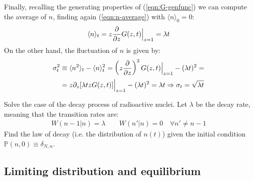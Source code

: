 \documentclass[../../main.tex]{subfiles}
\begin{document}
\begin{example}
    Finally, recalling the generating properties of (\ref{eqn:G-genfunc}) we can compute the average of $n$, finding again (\ref{eqn:n-average}) with $\langle n \rangle_0 = 0$:
    \begin{align*}
        \langle n \rangle_t = z \pdv{z} G(z,t) \Big|_{z=1} = \lambda t
    \end{align*}
    On the other hand, the fluctuation of $n$ is given by:
    \begin{align*}
        \sigma_t^2 &\equiv \langle n^2 \rangle_t - \langle n \rangle^2_t = \left(z \pdv{z}\right)^2 G(z,t)\Big|_{z=1} - (\lambda t)^2 = \\
        &= z \partial_z [\lambda t z G(z,t)]\Big|_{z=1} - (\lambda t)^2 = \lambda t \Rightarrow \sigma_t = \sqrt{\lambda t}
    \end{align*}
\end{example}

\begin{exo}
    Solve the case of the decay process of radioactive nuclei. Let $\lambda$ be the decay rate, meaning that the transition rates are:
    \begin{align*}
        W(n-1|n) = \lambda \qquad W(n'|n) = 0 \quad \forall n' \neq n-1
    \end{align*}
    Find the law of decay (i.e. the distribution of $n(t)$) given the initial condition $\mathbb{P}(n,0) \equiv \delta_{N,n}$.
\end{exo}

\subsection{Limiting distribution and equilibrium}
\end{document}
